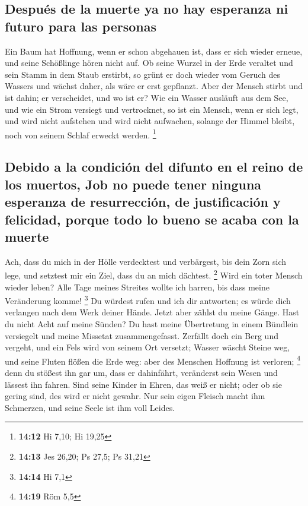 \hypertarget{despuuxe9s-de-la-muerte-ya-no-hay-esperanza-ni-futuro-para-las-personas}{%
\subsection{Después de la muerte ya no hay esperanza ni futuro para las
personas}\label{despuuxe9s-de-la-muerte-ya-no-hay-esperanza-ni-futuro-para-las-personas}}

 Ein Baum hat Hoffnung, wenn er schon abgehauen ist, dass
er sich wieder erneue, und seine Schößlinge hören nicht auf.
 Ob seine Wurzel in der Erde veraltet und sein Stamm in
dem Staub erstirbt,  so grünt er doch wieder vom Geruch
des Wassers und wächst daher, als wäre er erst gepflanzt.
 Aber der Mensch stirbt und ist dahin; er verscheidet,
und wo ist er?  Wie ein Wasser ausläuft aus dem See, und
wie ein Strom versiegt und vertrocknet,  so ist ein
Mensch, wenn er sich legt, und wird nicht aufstehen und wird nicht
aufwachen, solange der Himmel bleibt, noch von seinem Schlaf erweckt
werden. \footnote{\textbf{14:12} Hi 7,10; Hi 19,25}

\hypertarget{debido-a-la-condiciuxf3n-del-difunto-en-el-reino-de-los-muertos-job-no-puede-tener-ninguna-esperanza-de-resurrecciuxf3n-de-justificaciuxf3n-y-felicidad-porque-todo-lo-bueno-se-acaba-con-la-muerte}{%
\subsection{Debido a la condición del difunto en el reino de los
muertos, Job no puede tener ninguna esperanza de resurrección, de
justificación y felicidad, porque todo lo bueno se acaba con la
muerte}\label{debido-a-la-condiciuxf3n-del-difunto-en-el-reino-de-los-muertos-job-no-puede-tener-ninguna-esperanza-de-resurrecciuxf3n-de-justificaciuxf3n-y-felicidad-porque-todo-lo-bueno-se-acaba-con-la-muerte}}

 Ach, dass du mich in der Hölle verdecktest und
verbärgest, bis dein Zorn sich lege, und setztest mir ein Ziel, dass du
an mich dächtest. \footnote{\textbf{14:13} Jes 26,20; Ps 27,5; Ps 31,21}
 Wird ein toter Mensch wieder leben? Alle Tage meines
Streites wollte ich harren, bis dass meine Veränderung komme!
\footnote{\textbf{14:14} Hi 7,1}  Du würdest rufen und
ich dir antworten; es würde dich verlangen nach dem Werk deiner Hände.
 Jetzt aber zählst du meine Gänge. Hast du nicht Acht auf
meine Sünden?  Du hast meine Übertretung in einem
Bündlein versiegelt und meine Missetat zusammengefasst. 
Zerfällt doch ein Berg und vergeht, und ein Fels wird von seinem Ort
versetzt;  Wasser wäscht Steine weg, und seine Fluten
flößen die Erde weg: aber des Menschen Hoffnung ist verloren;
\footnote{\textbf{14:19} Röm 5,5}  denn du stößest ihn
gar um, dass er dahinfährt, veränderst sein Wesen und lässest ihn
fahren.  Sind seine Kinder in Ehren, das weiß er nicht;
oder ob sie gering sind, des wird er nicht gewahr.  Nur
sein eigen Fleisch macht ihm Schmerzen, und seine Seele ist ihm voll
Leides.

